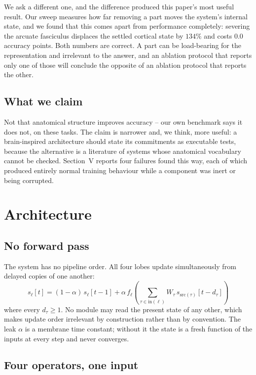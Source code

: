\documentclass[conference]{IEEEtran}
\begin{document}
We ask a different one, and the difference produced this paper's most useful
result. Our sweep measures how far removing a part moves the system's internal
state, and we found that this comes apart from performance completely: severing
the arcuate fasciculus displaces the settled cortical state by $134\%$ and
costs $0.0$ accuracy points. Both numbers are correct. A part can be
load-bearing for the representation and irrelevant to the answer, and an
ablation protocol that reports only one of those will conclude the opposite of
an ablation protocol that reports the other.

\subsection{What we claim}

Not that anatomical structure improves accuracy -- our own benchmark says it
does not, on these tasks. The claim is narrower and, we think, more useful: a
brain-inspired architecture should state its commitments as executable tests,
because the alternative is a literature of systems whose anatomical vocabulary
cannot be checked. Section~V reports four failures found this way, each of
which produced entirely normal training behaviour while a component was inert
or being corrupted.

\section{Architecture}

\subsection{No forward pass}

The system has no pipeline order. All four lobes update simultaneously from
delayed copies of one another:
\begin{equation}
s_\ell[t] = (1-\alpha)\, s_\ell[t-1] + \alpha \, f_\ell\!\left(
\textstyle\sum_{\tau \in \mathrm{in}(\ell)} W_\tau\, s_{\mathrm{src}(\tau)}[t - d_\tau]\right)
\end{equation}
where every $d_\tau \ge 1$. No module may read the present state of any other,
which makes update order irrelevant by construction rather than by convention.
The leak $\alpha$ is a membrane time constant; without it the state is a fresh
function of the inputs at every step and never converges.

\subsection{Four operators, one input}
\end{document}
